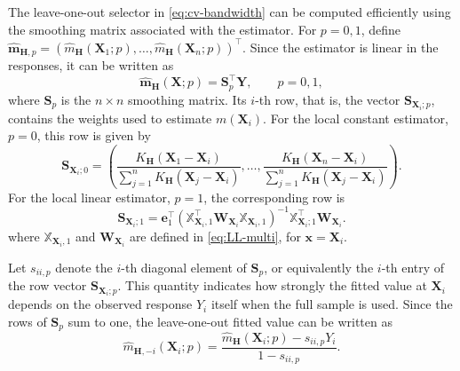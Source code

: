 \documentclass[12pt]{report} %
\newcommand{\bH}{\mathbf{H}}
\newcommand{\bX}{\mathbf{X}}
\newcommand{\bx}{\mathbf{x}}
\newcommand{\bY}{\mathbf{Y}}
\newcommand{\be}{\mathbf{e}}
\begin{document}
The leave-one-out selector in \eqref{eq:cv-bandwidth} can be computed efficiently using the smoothing matrix associated with the estimator. For $p=0,1$, define $ \hat{\mathbf{m}}_{\bH,p}= \left( \hat{m}_{\bH}(\bX_1;p), \ldots, \hat{m}_{\bH}(\bX_n;p) \right)^\top$. Since the estimator is linear in the responses, it can be written as
\begin{equation*}
     \hat{\mathbf{m}}_{\bH}(\bX;p)= \mathbf{S}_{p}^{\top}\bY, \qquad p = 0,1,
\end{equation*}
where $\mathbf{S}_{p}$ is the $n\times n$ smoothing matrix. Its $i$-th row, that is, the vector $\mathbf{S}_{\bX_i; p}$, contains the weights used to estimate $m(\bX_i)$. For the local constant estimator, $p=0$, this row is given by
\begin{equation}
    \label{eq:weightS_NW}
    \mathbf{S}_{\bX_i; 0}=
    \left(
        \frac{K_{\bH}(\bX_1-\bX_i)}
        {\sum_{j=1}^{n}K_{\bH}(\bX_j-\bX_i)},
        \ldots,
        \frac{K_{\bH}(\bX_n-\bX_i)}
        {\sum_{j=1}^{n}K_{\bH}(\bX_j-\bX_i)}
    \right).
\end{equation}
For the local linear estimator, $p=1$, the corresponding row is
\begin{equation}
 \label{eq:weightS_LL}
\mathbf{S}_{\bX_i;1}= \be_1^{\top}
    \left(\mathbb{X}_{\bX_i,1}^\top
        \boldsymbol{W}_{\bX_i}
        \mathbb{X}_{\bX_i,1}
    \right)^{-1}
    \mathbb{X}_{\bX_i; 1}^\top\boldsymbol{W}_{\bX_i}.
\end{equation}
where $\mathbb{X}_{\bX_i,1}$ and $\boldsymbol{W}_{\bX_i}$ are defined in \eqref{eq:LL-multi}, for $\bx = \bX_i$.

Let $s_{ii,p}$ denote the $i$-th diagonal element of
$\mathbf{S}_{p}$, or equivalently the $i$-th entry of the row vector $\mathbf{S}_{\bX_i; p}$. This quantity indicates how strongly the fitted value at $\bX_i$ depends on the
observed response $Y_i$ itself when the full sample is used. Since the rows of $\mathbf{S}_{p}$ sum to one, the leave-one-out fitted value can be written as
\begin{equation*}
    \hat{m}_{\bH,-i}(\bX_i;p)=\frac{\hat{m}_{\bH}(\bX_i;p)-s_{ii,p}Y_i}{1-s_{ii,p}}.
\end{equation*}
    
\end{document}
